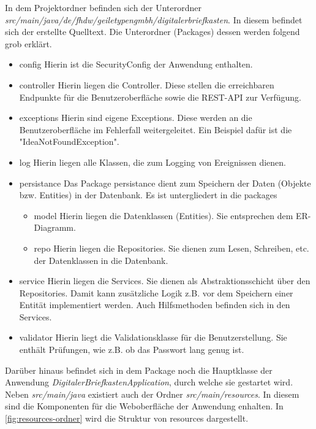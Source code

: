 In dem Projektordner befinden sich der Unterordner \textit{src/main/java/de/fhdw/geiletypengmbh/digitalerbriefkasten}. In diesem
befindet sich der erstellte Quelltext. Die Unterordner (Packages) dessen werden folgend grob erklärt.
\begin{itemize}
    \item config
    \subitem Hierin ist die SecurityConfig der Anwendung enthalten.
    \item controller
    \subitem Hierin liegen die Controller. Diese stellen die erreichbaren Endpunkte für die Benutzeroberfläche sowie die REST-API zur Verfügung.
    \item exceptions
    \subitem Hierin sind eigene Exceptions. Diese werden an die Benutzeroberfläche im Fehlerfall weitergeleitet. Ein Beispiel dafür ist die "IdeaNotFoundException".
    \item log
    \subitem Hierin liegen alle Klassen, die zum Logging von Ereignissen dienen.
    \item persistance
    \subitem Das Package persistance dient zum Speichern der Daten (Objekte bzw. Entities) in der Datenbank. Es ist untergliedert
    in die packages
    \begin{itemize}
        \item model
        \subitem Hierin liegen die Datenklassen (Entities). Sie entsprechen dem ER-Diagramm.
        \item repo
        \subitem Hierin liegen die Repositories. Sie dienen zum Lesen, Schreiben, etc. der Datenklassen in die Datenbank.
    \end{itemize}
    \item service
    \subitem Hierin liegen die Services. Sie dienen als Abstraktionsschicht über den Repositories. Damit kann zusätzliche Logik z.B. vor dem Speichern einer Entität implementiert werden. Auch Hilfsmethoden befinden sich in den Services.
    \item validator
    \subitem Hierin liegt die Validationsklasse für die Benutzerstellung. Sie enthält Prüfungen, wie z.B. ob das Passwort lang genug ist.
\end{itemize}
Darüber hinaus befindet sich in dem Package noch die Hauptklasse der Anwendung \textit{DigitalerBriefkastenApplication}, durch welche sie gestartet wird.
\newline
Neben \textit{src/main/java} existiert auch der Ordner \textit{src/main/resources}. In diesem sind die Komponenten für die Weboberfläche der Anwendung enhalten.
In \cref{fig:resources-ordner} wird die Struktur von resources dargestellt.


